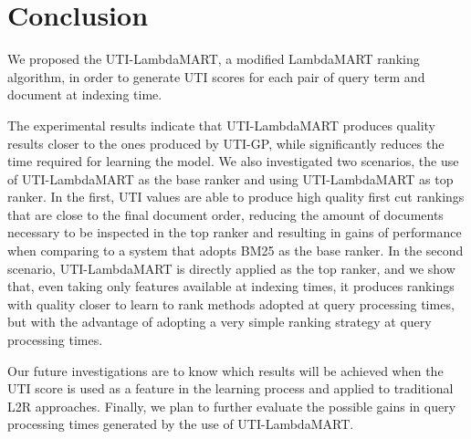 \documentclass[preprint,review,10pt,3p]{elsarticle}
\begin{document}
\section{Conclusion}

We proposed the UTI-LambdaMART, a modified LambdaMART ranking algorithm, in order to generate UTI scores for each pair of query term and document at indexing time.

The experimental results indicate that UTI-LambdaMART produces quality results closer to the ones produced by UTI-GP, while significantly reduces the time required for learning the model. 
We also investigated two scenarios, the use of UTI-LambdaMART as the base ranker and using UTI-LambdaMART as top ranker. In the first, UTI values are able to produce high quality first cut rankings that are close to the final document order, reducing the amount of documents necessary to be inspected in the top ranker and resulting
in gains of performance when comparing to a system that adopts BM25 as the base ranker. In the second scenario, UTI-LambdaMART is directly applied as the top ranker, and we show that, even taking only features available at indexing times, it produces rankings with quality closer to learn to rank methods adopted at query processing times, but with the advantage of adopting a very simple ranking
strategy at query processing times.



Our future investigations are to know which results will be achieved when the UTI score is used as a feature in the learning process and applied to traditional L2R approaches. Finally, we plan to further evaluate the possible gains in query processing times generated by the use of   UTI-LambdaMART.
\end{document}
